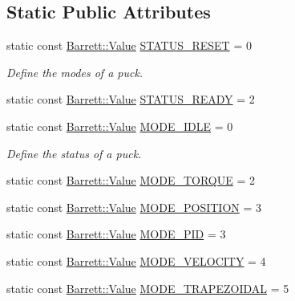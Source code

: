 \subsection*{Static Public Attributes}
\begin{DoxyCompactItemize}
\item 
static const \hyperlink{struct_barrett_a57ff132885344ca62e4b4b691885685b}{Barrett\-::\-Value} \hyperlink{classosa_puck_ada7927c208d1f07285d12074998bbf4c}{S\-T\-A\-T\-U\-S\-\_\-\-R\-E\-S\-E\-T} = 0
\begin{DoxyCompactList}\small\item\em Define the modes of a puck. \end{DoxyCompactList}\item 
static const \hyperlink{struct_barrett_a57ff132885344ca62e4b4b691885685b}{Barrett\-::\-Value} \hyperlink{classosa_puck_a0d02e251c5e3c54e0511cbb6d87dc619}{S\-T\-A\-T\-U\-S\-\_\-\-R\-E\-A\-D\-Y} = 2
\item 
static const \hyperlink{struct_barrett_a57ff132885344ca62e4b4b691885685b}{Barrett\-::\-Value} \hyperlink{classosa_puck_ad650adededab3406a2afb64c382b4b6b}{M\-O\-D\-E\-\_\-\-I\-D\-L\-E} = 0
\begin{DoxyCompactList}\small\item\em Define the status of a puck. \end{DoxyCompactList}\item 
static const \hyperlink{struct_barrett_a57ff132885344ca62e4b4b691885685b}{Barrett\-::\-Value} \hyperlink{classosa_puck_aabdc001b07826137272fb01ffb200aac}{M\-O\-D\-E\-\_\-\-T\-O\-R\-Q\-U\-E} = 2
\item 
static const \hyperlink{struct_barrett_a57ff132885344ca62e4b4b691885685b}{Barrett\-::\-Value} \hyperlink{classosa_puck_a7bbba0c7e8896c0d8b6da42f60d7ec0d}{M\-O\-D\-E\-\_\-\-P\-O\-S\-I\-T\-I\-O\-N} = 3
\item 
static const \hyperlink{struct_barrett_a57ff132885344ca62e4b4b691885685b}{Barrett\-::\-Value} \hyperlink{classosa_puck_a60ac2cf88c6c517f01db4569843a5e1a}{M\-O\-D\-E\-\_\-\-P\-I\-D} = 3
\item 
static const \hyperlink{struct_barrett_a57ff132885344ca62e4b4b691885685b}{Barrett\-::\-Value} \hyperlink{classosa_puck_a34b1e12b935b2890de3a86a5a8735733}{M\-O\-D\-E\-\_\-\-V\-E\-L\-O\-C\-I\-T\-Y} = 4
\item 
static const \hyperlink{struct_barrett_a57ff132885344ca62e4b4b691885685b}{Barrett\-::\-Value} \hyperlink{classosa_puck_ae59c70fb0ca441fbbce58a50539c7b36}{M\-O\-D\-E\-\_\-\-T\-R\-A\-P\-E\-Z\-O\-I\-D\-A\-L} = 5
\end{DoxyCompactItemize}


